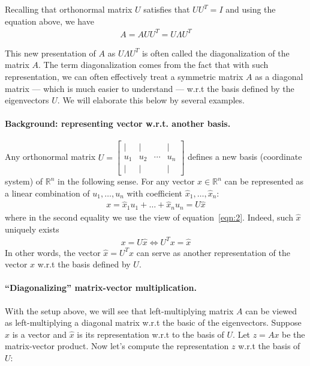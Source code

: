 \documentclass[12pt]{article}
\begin{document}
Recalling that orthonormal matrix $U$ satisfies that $UU^T = I$ and using the equation above, we have 
\begin{align}
A = AUU^T = U\Lambda U^T \label{eqn:3}
\end{align}

This new presentation of $A$ as $U\Lambda U^T$ is often called the diagonalization of the matrix $A$. The term diagonalization comes from the fact that with such representation, we can often effectively treat a symmetric matrix $A$ as a diagonal matrix --- which is much easier to understand --- w.r.t the basis defined by the eigenvectors $U$. We will elaborate this below by several examples. 

\newcommand{\R}{\mathbb{R}}
\paragraph{Background: representing vector w.r.t. another basis.} Any orthonormal matrix $U =  \left [
\begin{array}{cccc} | & | &  & | \\ u_1 &  u_2 & \cdots & u_n \\ | &
| &  & | \end{array} \right ]  $ defines a new basis (coordinate system) of $\mathbb{R}^n$ in the following sense. For any vector $x\in \mathbb{R}^n$ can be represented as a linear combination of $u_1,\dots, u_n$ with coefficient $\hat{x}_1,\dots, \hat{x}_n$:
\begin{align}
x = \hat{x}_1 u_1 + \dots + \hat{x}_n u_n  = U\hat{x} \nonumber
\end{align}
where in the second equality we use the view of equation~\eqref{eqn:2}. Indeed, such $\hat{x}$ uniquely exists 
\begin{align}
x = U\hat{x} \Leftrightarrow U^T x = \hat{x} \nonumber
\end{align}
In other words,  the vector $\hat{x}= U^T x$ can serve as another representation of the vector $x$ w.r.t the basis defined by $U$. 


\paragraph{``Diagonalizing'' matrix-vector multiplication.} With the setup above, we will see that left-multiplying matrix $A$ can be viewed as left-multiplying a diagonal matrix w.r.t the basic of the eigenvectors. Suppose $x$ is a vector and $\hat{x}$ is its representation w.r.t to the basis of $U$. Let $z = Ax$ be the matrix-vector product. Now let's compute the representation $z$ w.r.t the basis of $U$: 
\end{document}
